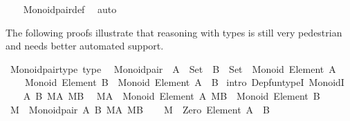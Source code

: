 \begin{isabellebody}
%
\isadelimproof
\ \ %
\endisadelimproof
%
\isatagproof
{}\isamarkupfalse%
\ Monoid{\isacharunderscore}{\kern0pt}pair{\isacharunderscore}{\kern0pt}def\ \isamarkupfalse%
\ auto%
\endisatagproof
{\isafoldproof}%
%
\isadelimproof
%
\endisadelimproof
%
\begin{isamarkuptext}%
The following proofs illustrate that reasoning with types is still very
pedestrian and needs better automated support.%
\end{isamarkuptext}\isamarkuptrue%
\isamarkupfalse%
\ Monoid{\isacharunderscore}{\kern0pt}pair{\isacharunderscore}{\kern0pt}type\ {\isacharbrackleft}{\kern0pt}type{\isacharbrackright}{\kern0pt}{\isacharcolon}{\kern0pt}\isanewline
\ \ {\isachardoublequoteopen}Monoid{\isacharunderscore}{\kern0pt}pair\ {\isacharcolon}{\kern0pt}\ {\isacharparenleft}{\kern0pt}A\ {\isacharcolon}{\kern0pt}\ Set{\isacharparenright}{\kern0pt}\ {\isasymRightarrow}\ {\isacharparenleft}{\kern0pt}B\ {\isacharcolon}{\kern0pt}\ Set{\isacharparenright}{\kern0pt}\ {\isasymRightarrow}\ Monoid\ {\isacharparenleft}{\kern0pt}Element\ A{\isacharparenright}{\kern0pt}\ {\isasymRightarrow}\isanewline
\ \ \ \ Monoid\ {\isacharparenleft}{\kern0pt}Element\ B{\isacharparenright}{\kern0pt}\ {\isasymRightarrow}\ Monoid\ {\isacharparenleft}{\kern0pt}Element\ {\isacharparenleft}{\kern0pt}A\ {\isasymtimes}\ B{\isacharparenright}{\kern0pt}{\isacharparenright}{\kern0pt}{\isachardoublequoteclose}\isanewline
%
\isadelimproof
%
\endisadelimproof
%
\isatagproof
{}\isamarkupfalse%
\ {\isacharparenleft}{\kern0pt}intro\ Dep{\isacharunderscore}{\kern0pt}fun{\isacharunderscore}{\kern0pt}typeI\ MonoidI{\isacharparenright}{\kern0pt}\isanewline
\ \ \isamarkupfalse%
\ A\ B\ MA\ MB\ \isamarkupfalse%
\ {\isachardoublequoteopen}MA\ {\isacharcolon}{\kern0pt}\ Monoid\ {\isacharparenleft}{\kern0pt}Element\ A{\isacharparenright}{\kern0pt}{\isachardoublequoteclose}\ {\isachardoublequoteopen}MB\ {\isacharcolon}{\kern0pt}\ Monoid\ {\isacharparenleft}{\kern0pt}Element\ B{\isacharparenright}{\kern0pt}{\isachardoublequoteclose}\isanewline
\ \ \isamarkupfalse%
\ {\isacharquery}{\kern0pt}M\ {\isacharequal}{\kern0pt}\ {\isachardoublequoteopen}Monoid{\isacharunderscore}{\kern0pt}pair\ A\ B\ MA\ MB{\isachardoublequoteclose}\isanewline
\ \ \isamarkupfalse%
\ {\isachardoublequoteopen}{\isacharquery}{\kern0pt}M\ {\isacharcolon}{\kern0pt}\ Zero\ {\isacharparenleft}{\kern0pt}Element\ {\isacharparenleft}{\kern0pt}A\ {\isasymtimes}\ B{\isacharparenright}{\kern0pt}{\isacharparenright}{\kern0pt}{\isachardoublequoteclose}\isanewline

\end{isabellebody}
